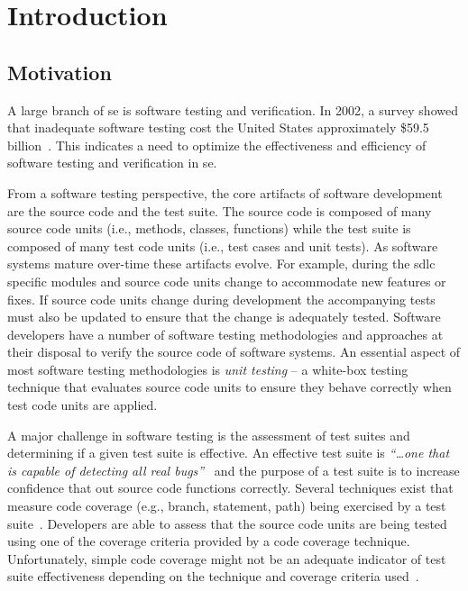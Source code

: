 \chapter{Introduction}
\label{chap:introduction}


\section{Motivation}
\label{sec:introduction_motivation}
A large branch of \gls{se} is software testing and verification. In 2002, a survey showed that inadequate software testing cost the United States approximately \$59.5 billion~\cite{RTI02}. This indicates a need to optimize the effectiveness and efficiency of software testing and verification in \gls{se}.

From a software testing perspective, the core artifacts of software development are the source code and the test suite. The source code is composed of many source code units (i.e., methods, classes, functions) while the test suite is composed of many test code units (i.e., test cases and unit tests). As software systems mature over-time these artifacts evolve. For example, during the \gls{sdlc} specific modules and source code units change to accommodate new features or fixes. If source code units change during development the accompanying tests must also be updated to ensure that the change is adequately tested. Software developers have a number of software testing methodologies and approaches at their disposal to verify the source code of software systems. An essential aspect of most software testing methodologies is \emph{unit testing} -- a white-box testing technique that evaluates source code units to ensure they behave correctly when test code units are applied.

A major challenge in software testing is the assessment of test suites and determining if a given test suite is effective. An effective test suite is \emph{``\ldots one that is capable of detecting all real bugs''}~\cite{Wey93} and the purpose of a test suite is to increase confidence that out source code functions correctly. Several techniques exist that measure code coverage (e.g., branch, statement, path) being exercised by a test suite~\cite{ZHM97}. Developers are able to assess that the source code units are being tested using one of the coverage criteria provided by a code coverage technique. Unfortunately, simple code coverage might not be an adequate indicator of test suite effectiveness depending on the technique and coverage criteria used~\cite{NA09,GJ08}.

